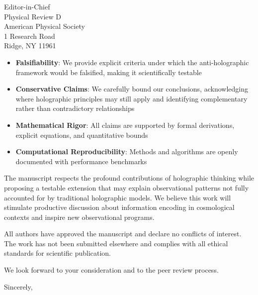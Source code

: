 \documentclass[11pt]{letter}
\begin{document}
\begin{letter}{Editor-in-Chief\\Physical Review D\\American Physical Society\\1 Research Road\\Ridge, NY 11961}
\begin{itemize}
    \item \textbf{Falsifiability}: We provide explicit criteria under which the anti-holographic framework would be falsified, making it scientifically testable
    
    \item \textbf{Conservative Claims}: We carefully bound our conclusions, acknowledging where holographic principles may still apply and identifying complementary rather than contradictory relationships
    
    \item \textbf{Mathematical Rigor}: All claims are supported by formal derivations, explicit equations, and quantitative bounds
    
    \item \textbf{Computational Reproducibility}: Methods and algorithms are openly documented with performance benchmarks
\end{itemize}

The manuscript respects the profound contributions of holographic thinking while proposing a testable extension that may explain observational patterns not fully accounted for by traditional holographic models. We believe this work will stimulate productive discussion about information encoding in cosmological contexts and inspire new observational programs.

All authors have approved the manuscript and declare no conflicts of interest. The work has not been submitted elsewhere and complies with all ethical standards for scientific publication.

We look forward to your consideration and to the peer review process.

\closing{Sincerely,}

\end{letter}
\end{document}
